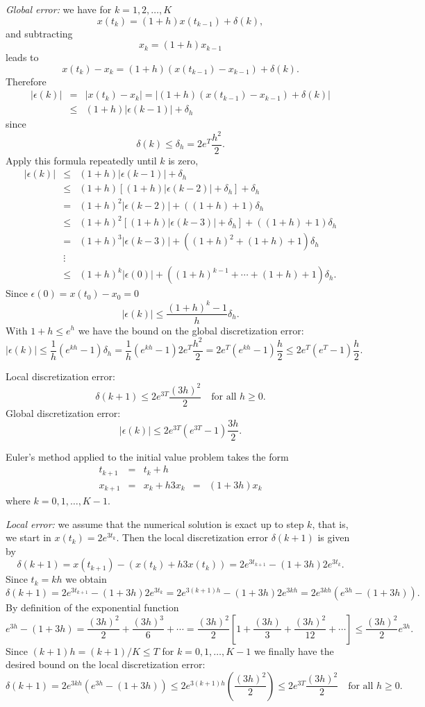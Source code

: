 \documentclass{ximera}
\begin{document}
{\em Global error:} we have for $k=1,2,\ldots,K$
\[
x(t_k)=(1+h)x(t_{k-1})+\delta(k),
\]
and subtracting
\[
x_k = (1+h)x_{k-1}
\]
leads to
\[
x(t_k) - x_k = (1+h)(x(t_{k-1})-x_{k-1})+\delta(k).
\]
Therefore
\begin{eqnarray*}
|\epsilon(k)| & = & |x(t_k) - x_k| =
|(1+h)(x(t_{k-1})-x_{k-1})+\delta(k)|\\
& \le & (1+h)|\epsilon(k-1)|+\delta_h
\end{eqnarray*}
since
\[
\delta(k)\le \delta_h = 2e^{T}\frac{h^2}{2}.
\]
Apply this formula repeatedly until $k$ is zero,
\[
\begin{array}{rcl}
|\epsilon(k)|&\le&(1+h)|\epsilon(k-1)|+\delta_h\\
&\le& (1+h)[(1+h)|\epsilon(k-2)|+\delta_h]+\delta_h\\
&=& (1+h)^2|\epsilon(k-2)| + ((1+h) + 1)\delta_h\\
&\le& (1+h)^2[(1+h)|\epsilon(k-3)|+\delta_h] + ((1+h) + 1)\delta_h\\
&=& (1+h)^3|\epsilon(k-3)| + ((1+h)^2 + (1+h) + 1)\delta_h\\
&\vdots& \\
&\le & (1+h)^k|\epsilon(0)| + ((1+h)^{k-1} +\cdots + (1+h) + 1)\delta_h.
\end{array}
\]
Since $\epsilon(0)=x(t_0) - x_0=0$
\[
|\epsilon(k)| \le \frac{(1+h)^k -1}{h}\delta_h.
\]
With $1+h\le e^{h}$ we have the bound on the global discretization error:
\[
|\epsilon(k)| \le \frac{1}{h} (e^{kh}-1)\delta_h=
\frac{1}{h}(e^{kh}-1)2e^{T}\frac{h^2}{2} =
2e^{T}(e^{kh}-1)\frac{h}{2}
\le 2e^{T}(e^{T}-1)\frac{h}{2}.
\]


 \ans Local discretization error:
\[
\delta(k+1) \le
2e^{3T}\frac{(3h)^2}{2} \quad \mbox{for all $h\ge 0$.}
\]
Global discretization error:
\[
|\epsilon(k)| \le 2e^{3T}(e^{3T}-1)\frac{3h}{2}.
\]

\soln Euler's method applied to the initial value problem takes the form
\[
\begin{array}{rclcl}
t_{k+1} & = & t_k+h & & \\
x_{k+1} & = & x_k + h 3x_k & = & (1+3h)x_k
\end{array}
\]
where $k=0,1,\ldots,K-1$.

{\em Local error:} we assume that the
numerical solution is exact up to step $k$, that is,
we start in $x(t_k)=2e^{3t_k}$.  Then the local discretization error
$\delta(k+1)$ is given by
\[
\delta(k+1) = x(t_{k+1}) - (x(t_k) + h 3 x(t_k))=
2e^{3t_{k+1}} - (1+3h)2e^{3t_k}.
\]
Since $t_k = kh$ we obtain
\[
\delta(k+1) = 2e^{3t_{k+1}} - (1+3h)2e^{3t_k} =
2e^{3(k+1)h} - (1+3h)2e^{3kh} = 2e^{3kh}(e^{3h}-(1+3h)).
\]
By definition of the exponential function
\[
e^{3h}-(1+3h) = \frac{(3h)^2}{2}+\frac{(3h)^3}{6}+\cdots =
\frac{(3h)^2}{2}\left[ 1+\frac{(3h)}{3}+\frac{(3h)^2}{12}+\cdots\right]
\le \frac{(3h)^2}{2}e^{3h}.
\]
Since $(k+1)h=(k+1)/K\le T$ for $k=0,1,\ldots,K-1$ we finally have the
desired bound on the local discretization error:
\[
\delta(k+1) = 2e^{3kh}(e^{3h}-(1+3h)) \le
2e^{3(k+1)h}\left(\frac{(3h)^2}{2}\right)\le
2e^{3T}\frac{(3h)^2}{2} \quad \mbox{for all $h\ge 0$.}
\]
\end{document}

